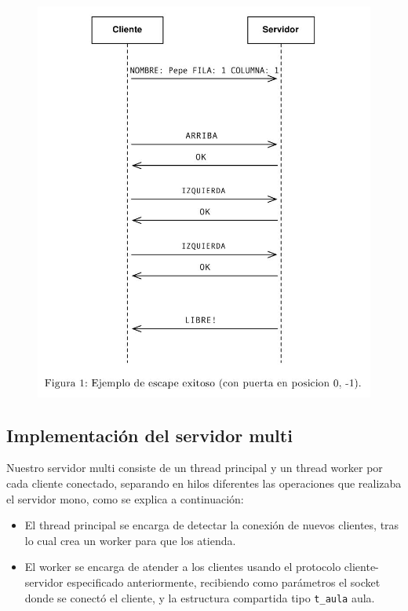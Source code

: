 \begin{figure}[H]
\centering
\includegraphics[scale=0.6]{img/prot.jpeg}
\end{figure}

\subsection{Implementaci\'on del servidor multi}

Nuestro servidor multi consiste de un thread principal y un thread worker por cada cliente conectado, separando en hilos diferentes las operaciones que realizaba el servidor mono, como se explica a continuaci\'on:

\begin{itemize}
\item El thread principal se encarga de detectar la conexi\'on de nuevos clientes, tras lo cual crea un worker para que los atienda.
\item El worker se encarga de atender a los clientes usando el protocolo cliente-servidor especificado anteriormente, recibiendo como par\'ametros el socket donde se conect\'o el cliente, y la estructura compartida tipo \verb|t_aula| aula.
\end{itemize}

